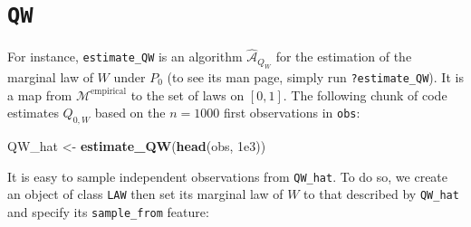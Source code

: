 \documentclass[11pt,openright,twoside]{book}
\newenvironment{Shaded}{\begin{snugshade}}{\end{snugshade}}
\newcommand{\ControlFlowTok}[1]{\textcolor[rgb]{0.13,0.29,0.53}{\textbf{#1}}}
\newcommand{\DataTypeTok}[1]{\textcolor[rgb]{0.13,0.29,0.53}{#1}}
\newcommand{\DecValTok}[1]{\textcolor[rgb]{0.00,0.00,0.81}{#1}}
\newcommand{\FloatTok}[1]{\textcolor[rgb]{0.00,0.00,0.81}{#1}}
\newcommand{\KeywordTok}[1]{\textcolor[rgb]{0.13,0.29,0.53}{\textbf{#1}}}
\newcommand{\NormalTok}[1]{#1}
\newcommand{\OperatorTok}[1]{\textcolor[rgb]{0.81,0.36,0.00}{\textbf{#1}}}
\newcommand{\OtherTok}[1]{\textcolor[rgb]{0.56,0.35,0.01}{#1}}
\newcommand{\StringTok}[1]{\textcolor[rgb]{0.31,0.60,0.02}{#1}}
\newcommand{\Algo}{\widehat{\mathcal{A}}}
\newcommand{\calM}{\mathcal{M}}
\theoremstyle{definition}
\theoremstyle{definition}
\theoremstyle{definition}
\theoremstyle{remark}
\begin{document}
\hypertarget{nuisance-QW}{%
\section{\texorpdfstring{\texttt{QW}}{QW}}\label{nuisance-QW}}

For instance, \texttt{estimate\_QW} is an algorithm \(\Algo_{Q_{W}}\) for the estimation
of the marginal law of \(W\) under \(P_{0}\) (to see its man page, simply run
\texttt{?estimate\_QW}). It is a map from \(\calM^{\text{empirical}}\) to the set of
laws on \([0,1]\). The following chunk of code estimates \(Q_{0,W}\) based on the
\(n = 1000\) first observations in \texttt{obs}:

\begin{Shaded}
\begin{Highlighting}[]
\NormalTok{QW_hat <-}\StringTok{ }\KeywordTok{estimate_QW}\NormalTok{(}\KeywordTok{head}\NormalTok{(obs, }\FloatTok{1e3}\NormalTok{))}
\end{Highlighting}
\end{Shaded}

It is easy to sample independent observations from \texttt{QW\_hat}. To do so, we
create an object of class \texttt{LAW} then set its marginal law of \(W\) to that
described by \texttt{QW\_hat} and specify its \texttt{sample\_from} feature:



\begin{Shaded}
\end{Shaded}
\end{document}
